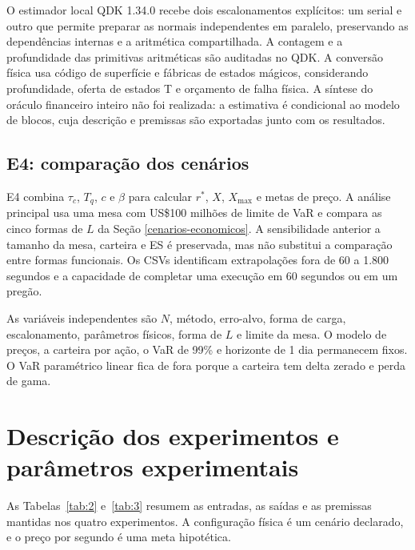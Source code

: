 \documentclass[conference,a4paper]{IEEEtran}
\begin{document}
O estimador local QDK 1.34.0 \cite{microsoft2026qre} recebe dois escalonamentos explícitos: um serial e outro que permite preparar as normais independentes em paralelo, preservando as dependências internas e a aritmética compartilhada. A contagem e a profundidade das primitivas aritméticas são auditadas no QDK. A conversão física usa código de superfície e fábricas de estados mágicos, considerando profundidade, oferta de estados T e orçamento de falha física. A síntese do oráculo financeiro inteiro não foi realizada: a estimativa é condicional ao modelo de blocos, cuja descrição e premissas são exportadas junto com os resultados.

\subsection{E4: comparação dos cenários}\label{e4-comparauxe7uxe3o-dos-cenuxe1rios}

E4 combina \(\tau_c\), \(T_q\), \(c\) e \(\beta\) para calcular \(r^*\), \(X\), \(X_{\max}\) e metas de preço. A análise principal usa uma mesa com US\$100 milhões de limite de VaR e compara as cinco formas de \(L\) da Seção \ref{cenarios-economicos}. A sensibilidade anterior a tamanho da mesa, carteira e ES é preservada, mas não substitui a comparação entre formas funcionais. Os CSVs identificam extrapolações fora de 60 a 1.800 segundos e a capacidade de completar uma execução em 60 segundos ou em um pregão.

As variáveis independentes são \(N\), método, erro-alvo, forma de carga, escalonamento, parâmetros físicos, forma de \(L\) e limite da mesa. O modelo de preços, a carteira por ação, o VaR de 99\% e horizonte de 1 dia permanecem fixos. O VaR paramétrico linear fica de fora porque a carteira tem delta zerado e perda de gama.

\section{Descrição dos experimentos e parâmetros experimentais}\label{descriuxe7uxe3o-dos-experimentos-e-paruxe2metros-experimentais}

As Tabelas~\ref{tab:2} e~\ref{tab:3} resumem as entradas, as saídas e as premissas mantidas nos quatro experimentos. A configuração física é um cenário declarado, e o preço por segundo é uma meta hipotética.
\end{document}
